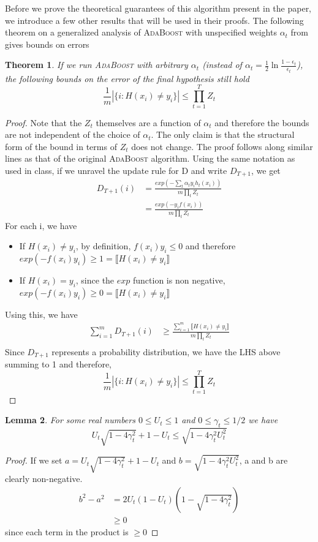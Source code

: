 \documentclass[11pt]{article}
\newtheorem{theorem}{Theorem}
\newtheorem{lemma}[theorem]{Lemma}
\begin{document}
Before we prove the theoretical guarantees of this algorithm present in the paper, we introduce a few other results that will be used in their proofs. 
The following theorem on a generalized analysis of \textsc{AdaBoost} with unspecified weights $\alpha_t$ from  \cite{Schapire:1999:IBA:337859.337870} gives bounds on errors
\begin{theorem}
If we run \textsc{AdaBoost} with arbitrary $\alpha_t$ (instead of $\alpha_t = \frac{1}{2} \ln \frac{1-\epsilon_t}{\epsilon_t}$), the following bounds on the error of the final hypothesis still hold
$$\frac{1}{m}|\{i : H(x_i) \neq y_i\}| \le \prod_{t=1}^T Z_t$$
\end{theorem}
\begin{proof}
Note that the $Z_t$ themselves are a function of $\alpha_t$ and therefore the bounds are not independent of the choice of $\alpha_t$. The only claim is that the structural form of the bound in terms of $Z_t$ does not change.
The proof follows along similar lines as that of the original \textsc{AdaBoost} algorithm. Using the same notation as used in class, if we unravel the update rule for D and write $D_{T+1}$, we get
\begin{align*}
D_{T+1}(i) &= \frac{exp(-\sum_t \alpha_t y_i h_t(x_i))}{m\prod_t Z_t}\\
&= \frac{exp(-y_i f(x_i))}{m \prod_t Z_t}
\end{align*}
For each i, we have
\begin{itemize}
\item If $H(x_i) \neq y_i$, by definition, $f(x_i) y_i \leq 0$ and therefore $exp(-f(x_i) y_i) \ge 1 = \llbracket H(x_i) \neq y_i \rrbracket$
\item If $H(x_i) = y_i$, since the $exp$ function is non negative, $exp(-f(x_i) y_i) \ge 0 = \llbracket H(x_i) \neq y_i \rrbracket$
\end{itemize}
Using this, we have
\begin{align*}
\sum_{i=1}^m D_{T+1}(i) &\ge \frac{\sum_{i=1}^m \llbracket H(x_i) \neq y_i \rrbracket}{m\prod_t Z_t}\\ 
\end{align*}
Since $D_{T+1}$ represents a probability distribution, we have the LHS above summing to 1 and therefore,
$$\frac{1}{m}|\{i : H(x_i) \neq y_i\}| \le \prod_{t=1}^T Z_t$$
\end{proof}

\begin{lemma} \label{lemma10}
For some real numbers $0 \le U_t \le 1$ and $0 \le \gamma_t \le 1/2$ we have $$U_t \sqrt{1-4\gamma_t^2} + 1-U_t \le \sqrt{1-4\gamma_t^2U_t^2}$$
\end{lemma}
\begin{proof}
If we set $a = U_t \sqrt{1-4\gamma_t^2} + 1-U_t$ and $b = \sqrt{1-4\gamma_t^2U_t^2}$, a and b are clearly non-negative. 
\begin{align*}
b^2-a^2 &= 2U_t(1-U_t)(1-\sqrt{1-4\gamma_t^2})\\
&\ge 0
\end{align*}
since each term in the product is $\ge 0$
\end{proof}
\end{document}
